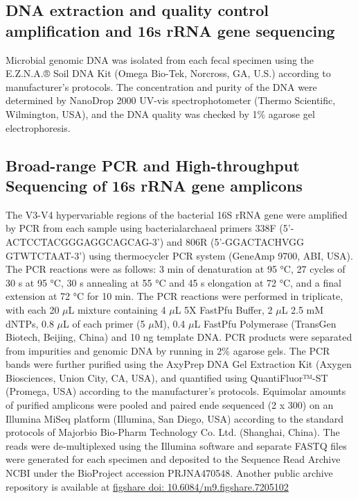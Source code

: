\documentclass[fleqn,10pt]{wlpeerj} %
\begin{document}
  \subsection*{DNA extraction and quality control amplification and 16s rRNA gene sequencing}
  Microbial genomic DNA was isolated from each fecal specimen using the E.Z.N.A.® Soil DNA Kit (Omega Bio-Tek, Norcross, GA, U.S.) according to manufacturer’s protocols. The concentration and purity of the DNA were determined by NanoDrop 2000 UV-vis spectrophotometer (Thermo Scientific, Wilmington, USA), and the DNA quality was checked by 1\% agarose gel electrophoresis.

  \subsection*{Broad-range PCR and High-throughput Sequencing of 16s rRNA gene amplicons}
  The V3-V4 hypervariable regions of the bacterial 16S rRNA gene were amplified by PCR from each sample using bacterial\/archaeal primers 338F (5’-ACTCCTACGGGAGGCAGCAG-3’) and 806R (5’-GGACTACHVGG GTWTCTAAT-3’) using thermocycler PCR system (GeneAmp 9700, ABI, USA). The PCR reactions were as follows: 3 min of denaturation at 95 °C, 27 cycles of 30 s at 95 °C, 30 s annealing at 55 °C and 45 s elongation at 72 °C, and a final extension at 72 °C for 10 min. The PCR reactions were performed in triplicate, with each 20 $\mu$L mixture containing 4 $\mu$L 5X FastPfu Buffer, 2 $\mu$L 2.5 mM dNTPs, 0.8 $\mu$L of each primer (5 $\mu$M), 0.4 $\mu$L FastPfu Polymerase (TransGen Biotech, Beijing, China) and 10 ng template DNA.  PCR products were separated from impurities and genomic DNA by running in 2\% agarose gels.  The PCR bands were further purified using the AxyPrep DNA Gel Extraction Kit (Axygen Biosciences, Union City, CA, USA), and quantified using QuantiFluor™-ST (Promega, USA) according to the manufacturer’s protocols.
  Equimolar amounts of purified amplicons were pooled and paired ende sequenced (2 x 300) on an Illumina MiSeq platform (Illumina, San Diego, USA) according to the standard protocols of Majorbio Bio-Pharm Technology Co. Ltd. (Shanghai, China). The reads were de-multiplexed using the Illumina software and separate FASTQ files were generated for each specimen and deposited to the Sequence Read Archive NCBI under the BioProject accession PRJNA470548. Another public archive repository is available at \href{https://figshare.com/articles/Untitled_Item192_samples_for_publishing_Longitudinal_gut_microbiota_patterns_in_preterm_infants_with_necrotizing_enterocolitis_or_late-onset_sepsis_an_observational_prospective_study_/7205102}{figshare doi: 10.6084/m9.figshare.7205102}
\end{document}

